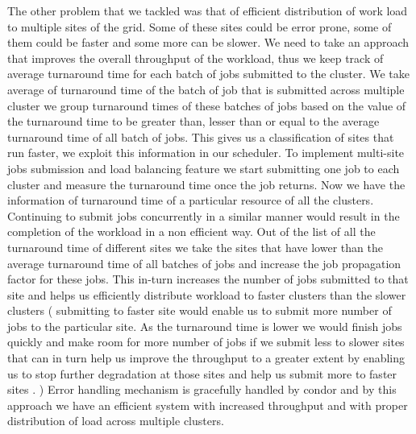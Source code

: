 \documentclass[ms,electronic,double]{nuthesis}
\begin{document}
The other problem that we tackled was that of efficient distribution of work load to multiple sites of the 
grid.
Some of these sites could be error prone, some of them could be faster and some more can be slower. We need to
take an approach that improves the overall throughput of the workload, thus we keep track of average turnaround
 time for each batch of jobs submitted to the cluster. We take average of turnaround time of the batch of job that is submitted 
 across multiple cluster we group turnaround times of these batches of jobs based on the value of the 
 turnaround time to be greater than, lesser than or equal to the average turnaround time of all batch of jobs.
 This gives us a classification of sites that run faster, we exploit this information in our scheduler. 
 To implement multi-site jobs submission and load balancing feature we start submitting one job to each cluster 
 and measure the turnaround time once the job returns. Now we have the information of turnaround time 
 of a particular resource of all the clusters. Continuing to submit jobs concurrently in a similar manner
  would result in the completion of
 the workload in a non efficient way. Out of the list of all the turnaround time of different sites we take the 
 sites
 that have lower than the average turnaround time of all batches of jobs and increase the job propagation 
 factor for these jobs. This in-turn increases the number of jobs submitted to that site and helps us efficiently distribute 
 workload to faster clusters than the slower clusters ( submitting to faster site would enable us to submit 
 more
  number of jobs to the particular site. As the turnaround time is lower we would finish jobs quickly and make room for more number 
  of jobs if we submit less to slower sites that can in turn help us improve the throughput to a greater extent by enabling us to stop
  further degradation at those sites and help us submit more to faster sites .
  ) 
  Error handling mechanism is gracefully handled by 
 condor and by this approach we have an efficient system with increased throughput and with proper distribution
  of load across multiple clusters.  
        
 
 
 
\end{document}
